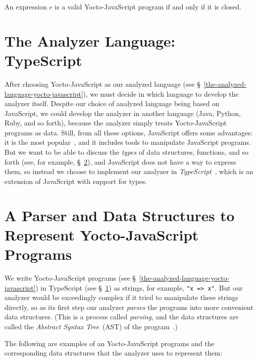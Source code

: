 \documentclass[12pt, oneside]{book}
\begin{document}
An expression $e$ is a valid Yocto-JavaScript program if and only if it is closed.

\section{The Analyzer Language: TypeScript}
\label{the-analyzer-language-typescript}

After choosing Yocto-JavaScript as our analyzed language (see §~\ref{the-analyzed-language-yocto-javascript}), we must decide in which language to develop the analyzer itself. Despite our choice of analyzed language being based on JavaScript, we could develop the analyzer in another language (Java, Python, Ruby, and so forth), because the analyzer simply treats Yocto-JavaScript programs as data. Still, from all these options, JavaScript offers some advantages: it is the most popular~\cite{stack-overflow-developer-survey, jet-brains-developer-survey}, and it includes tools to manipulate JavaScript programs. But we want to be able to discuss the \emph{types} of data structures, functions, and so forth (see, for example, §~\ref{a-parser-and-data-structures-to-represent-yocto-javascript programs}), and JavaScript does not have a way to express them, so instead we choose to implement our analyzer in \emph{TypeScript}~\cite{typescript, typescript-deep-dive, understanding-typescript}, which is an extension of JavaScript with support for types.

\section{A Parser and Data Structures to Represent Yocto-JavaScript Programs}
\label{a-parser-and-data-structures-to-represent-yocto-javascript programs}

We write Yocto-JavaScript programs (see §~\ref{the-analyzed-language-yocto-javascript}) in TypeScript (see §~\ref{the-analyzer-language-typescript}) as strings, for example, \texttt{"x => x"}. But our analyzer would be exceedingly complex if it tried to manipulate these strings directly, so as its first step our analyzer \emph{parses} the programs into more convenient data structures. (This is a process called \emph{parsing}, and the data structures are called the \emph{Abstract Syntax Tree}~(AST) of the program~\cite[§~4]{dragon-book}.)

The following are examples of an Yocto-JavaScript programs and the corresponding data structures that the analyzer uses to represent them:
\end{document}
